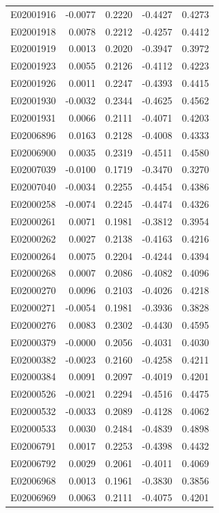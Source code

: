 \documentclass[11pt, a4paper]{article}
\begin{document}
\begin{longtable}{lrrrr}
E02001916 & -0.0077 & 0.2220 & -0.4427 & 0.4273 \\
E02001918 & 0.0078 & 0.2212 & -0.4257 & 0.4412 \\
E02001919 & 0.0013 & 0.2020 & -0.3947 & 0.3972 \\
E02001923 & 0.0055 & 0.2126 & -0.4112 & 0.4223 \\
E02001926 & 0.0011 & 0.2247 & -0.4393 & 0.4415 \\
E02001930 & -0.0032 & 0.2344 & -0.4625 & 0.4562 \\
E02001931 & 0.0066 & 0.2111 & -0.4071 & 0.4203 \\
E02006896 & 0.0163 & 0.2128 & -0.4008 & 0.4333 \\
E02006900 & 0.0035 & 0.2319 & -0.4511 & 0.4580 \\
E02007039 & -0.0100 & 0.1719 & -0.3470 & 0.3270 \\
E02007040 & -0.0034 & 0.2255 & -0.4454 & 0.4386 \\
E02000258 & -0.0074 & 0.2245 & -0.4474 & 0.4326 \\
E02000261 & 0.0071 & 0.1981 & -0.3812 & 0.3954 \\
E02000262 & 0.0027 & 0.2138 & -0.4163 & 0.4216 \\
E02000264 & 0.0075 & 0.2204 & -0.4244 & 0.4394 \\
E02000268 & 0.0007 & 0.2086 & -0.4082 & 0.4096 \\
E02000270 & 0.0096 & 0.2103 & -0.4026 & 0.4218 \\
E02000271 & -0.0054 & 0.1981 & -0.3936 & 0.3828 \\
E02000276 & 0.0083 & 0.2302 & -0.4430 & 0.4595 \\
E02000379 & -0.0000 & 0.2056 & -0.4031 & 0.4030 \\
E02000382 & -0.0023 & 0.2160 & -0.4258 & 0.4211 \\
E02000384 & 0.0091 & 0.2097 & -0.4019 & 0.4201 \\
E02000526 & -0.0021 & 0.2294 & -0.4516 & 0.4475 \\
E02000532 & -0.0033 & 0.2089 & -0.4128 & 0.4062 \\
E02000533 & 0.0030 & 0.2484 & -0.4839 & 0.4898 \\
E02006791 & 0.0017 & 0.2253 & -0.4398 & 0.4432 \\
E02006792 & 0.0029 & 0.2061 & -0.4011 & 0.4069 \\
E02006968 & 0.0013 & 0.1961 & -0.3830 & 0.3856 \\
E02006969 & 0.0063 & 0.2111 & -0.4075 & 0.4201 \\

\end{longtable}
\end{document}
